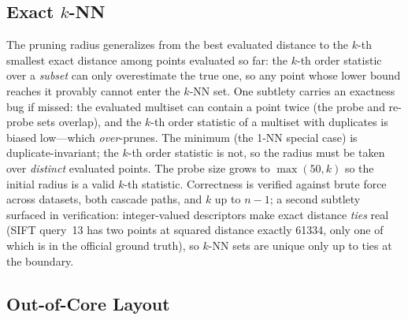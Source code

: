 \documentclass[sigconf,nonacm]{acmart}
\begin{document}
\subsection{Exact $k$-NN}
\label{sec:knn}

The pruning radius generalizes from the best evaluated distance to the
$k$-th smallest exact distance among points evaluated so far: the $k$-th
order statistic over a \emph{subset} can only overestimate the true one,
so any point whose lower bound reaches it provably cannot enter the
$k$-NN set. One subtlety carries an exactness bug if missed: the evaluated
multiset can contain a point twice (the probe and re-probe sets overlap),
and the $k$-th order statistic of a multiset with duplicates is biased
low---which \emph{over}-prunes. The minimum (the 1-NN special case) is
duplicate-invariant; the $k$-th order statistic is not, so the radius must
be taken over \emph{distinct} evaluated points. The probe size grows to
$\max(50, k)$ so the initial radius is a valid $k$-th statistic.
Correctness is verified against brute force across datasets, both cascade
paths, and $k$ up to $n-1$; a second subtlety surfaced in verification:
integer-valued descriptors make exact distance \emph{ties} real (SIFT
query~13 has two points at squared distance exactly 61334, only one of
which is in the official ground truth), so $k$-NN sets are unique only up
to ties at the boundary.

\subsection{Out-of-Core Layout}
\label{sec:layout}
\end{document}
